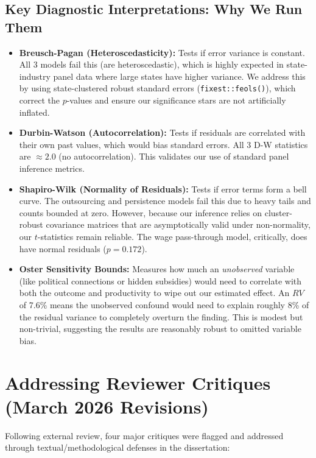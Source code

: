 \documentclass[11pt]{article}
\begin{document}
	\subsection*{Key Diagnostic Interpretations: Why We Run Them}
	\begin{itemize}
		\item \textbf{Breusch-Pagan (Heteroscedasticity):} Tests if error variance is constant. All 3 models fail this (are heteroscedastic), which is highly expected in state-industry panel data where large states have higher variance. We address this by using state-clustered robust standard errors (\texttt{fixest::feols()}), which correct the $p$-values and ensure our significance stars are not artificially inflated.
		\item \textbf{Durbin-Watson (Autocorrelation):} Tests if residuals are correlated with their own past values, which would bias standard errors. All 3 D-W statistics are $\approx 2.0$ (no autocorrelation). This validates our use of standard panel inference metrics.
		\item \textbf{Shapiro-Wilk (Normality of Residuals):} Tests if error terms form a bell curve. The outsourcing and persistence models fail this due to heavy tails and counts bounded at zero. However, because our inference relies on cluster-robust covariance matrices that are asymptotically valid under non-normality, our $t$-statistics remain reliable. The wage pass-through model, critically, does have normal residuals ($p=0.172$).
		\item \textbf{Oster Sensitivity Bounds:} Measures how much an \textit{unobserved} variable (like political connections or hidden subsidies) would need to correlate with both the outcome and productivity to wipe out our estimated effect. An $RV$ of 7.6\% means the unobserved confound would need to explain roughly 8\% of the residual variance to completely overturn the finding. This is modest but non-trivial, suggesting the results are reasonably robust to omitted variable bias.
	\end{itemize}
	
	\section{Addressing Reviewer Critiques (March 2026 Revisions)}
	Following external review, four major critiques were flagged and addressed through textual/methodological defenses in the dissertation:
	
\end{document}
